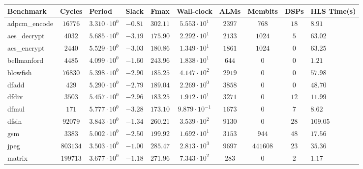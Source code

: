 \begin{tabular}{|l|c|HHc|c|c|c|cH|}
\hline
Benchmark     & Cycles       & Period                 & Slack     & Fmax       & Wall-clock              & ALMs      & Membits    & DSPs    & HLS Time(s) \\
\hline
adpcm\_encode & $ 16776    $ & $ 3.310 \cdot 10^{0} $ & $ -0.81 $ & $ 302.11 $ & $ 5.553 \cdot 10^{1}  $ & $ 2397  $ & $ 768    $ & $ 18  $ & $ 8.91    $ \\
aes\_decrypt  & $ 4032     $ & $ 5.685 \cdot 10^{0} $ & $ -3.19 $ & $ 175.90 $ & $ 2.292 \cdot 10^{1}  $ & $ 2133  $ & $ 1024   $ & $ 5   $ & $ 63.02   $ \\
aes\_encrypt  & $ 2440     $ & $ 5.529 \cdot 10^{0} $ & $ -3.03 $ & $ 180.86 $ & $ 1.349 \cdot 10^{1}  $ & $ 1861  $ & $ 1024   $ & $ 0   $ & $ 63.25   $ \\
bellmanford   & $ 4485     $ & $ 4.099 \cdot 10^{0} $ & $ -1.60 $ & $ 243.96 $ & $ 1.838 \cdot 10^{1}  $ & $ 644   $ & $ 0      $ & $ 0   $ & $ 1.21    $ \\
blowfish      & $ 76830    $ & $ 5.398 \cdot 10^{0} $ & $ -2.90 $ & $ 185.25 $ & $ 4.147 \cdot 10^{2}  $ & $ 2919  $ & $ 0      $ & $ 0   $ & $ 57.98   $ \\
dfadd         & $ 429      $ & $ 5.290 \cdot 10^{0} $ & $ -2.79 $ & $ 189.04 $ & $ 2.269 \cdot 10^{0}  $ & $ 3858  $ & $ 0      $ & $ 0   $ & $ 48.70   $ \\
dfdiv         & $ 3503     $ & $ 5.457 \cdot 10^{0} $ & $ -2.96 $ & $ 183.25 $ & $ 1.912 \cdot 10^{1}  $ & $ 3271  $ & $ 0      $ & $ 12  $ & $ 11.99   $ \\
dfmul         & $ 171      $ & $ 5.777 \cdot 10^{0} $ & $ -3.28 $ & $ 173.10 $ & $ 9.879 \cdot 10^{-1} $ & $ 1673  $ & $ 0      $ & $ 7   $ & $ 8.62    $ \\
dfsin         & $ 92079    $ & $ 3.843 \cdot 10^{0} $ & $ -1.34 $ & $ 260.21 $ & $ 3.539 \cdot 10^{2}  $ & $ 9130  $ & $ 0      $ & $ 28  $ & $ 109.05  $ \\
gsm           & $ 3383     $ & $ 5.002 \cdot 10^{0} $ & $ -2.50 $ & $ 199.92 $ & $ 1.692 \cdot 10^{1}  $ & $ 3153  $ & $ 944    $ & $ 48  $ & $ 17.56   $ \\
jpeg          & $ 803134   $ & $ 3.503 \cdot 10^{0} $ & $ -1.00 $ & $ 285.47 $ & $ 2.813 \cdot 10^{3}  $ & $ 9697  $ & $ 441608 $ & $ 23  $ & $ 35.36   $ \\
matrix        & $ 199713   $ & $ 3.677 \cdot 10^{0} $ & $ -1.18 $ & $ 271.96 $ & $ 7.343 \cdot 10^{2}  $ & $ 283   $ & $ 0      $ & $ 2   $ & $ 1.17    $ \\

\end{tabular}
